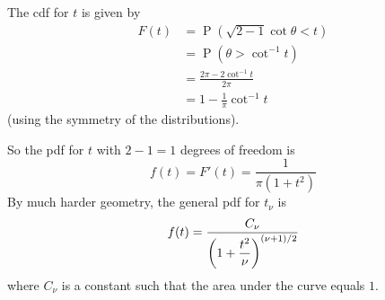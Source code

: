\documentclass[fleqn,a4paper,11pt]{article}
\DeclareMathOperator{\prob}{\mathrm P}
\begin{document}
The cdf for \(t\) is given by
\begin{align*}
F(t) &= \prob(\sqrt{2 - 1}\cot \theta < t) \\
     &= \prob(\theta > \cot^{-1} t) \\
     &= \frac{2\pi - 2\cot^{-1} t}{2\pi} \\
     &= 1 - \frac 1\pi \cot^{-1} t
\end{align*}
(using the symmetry of the distributions).

So the pdf for \(t\) with \(2 - 1 = 1\) degrees of freedom is
\begin{equation*}
f(t) = F'(t) = \frac{1}{\pi(1 + t^2)}
\end{equation*}
By much harder geometry, the general pdf for \(t_\nu\) is
\begin{equation*}
f(t) = \frac{C_\nu}{\pqty{1 + \dfrac{t^2}{\nu}}^{(\nu + 1) / 2}}
\end{equation*}
where \(C_\nu\) is a constant such that the area under the curve equals \(1\).
\end{document}
